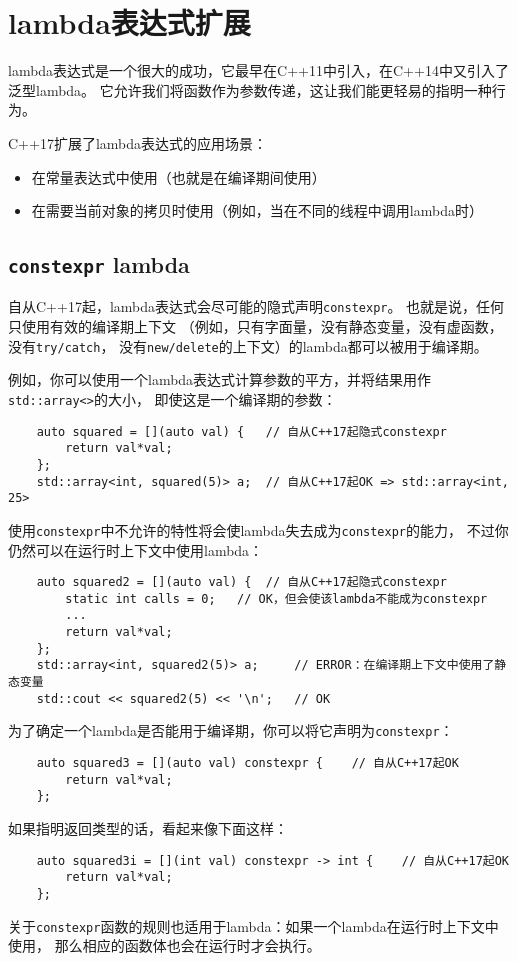 \section{lambda表达式扩展}\label{ch6}
lambda表达式是一个很大的成功，它最早在C++11中引入，在C++14中又引入了泛型lambda。
它允许我们将函数作为参数传递，这让我们能更轻易的指明一种行为。

C++17扩展了lambda表达式的应用场景：
\begin{itemize}[leftmargin=*]
    \item 在常量表达式中使用（也就是在编译期间使用）
    \item 在需要当前对象的拷贝时使用（例如，当在不同的线程中调用lambda时）
\end{itemize}

\subsection{\texttt{constexpr} lambda}
自从C++17起，lambda表达式会尽可能的隐式声明\texttt{constexpr}。
也就是说，任何只使用有效的编译期上下文
（例如，只有字面量，没有静态变量，没有虚函数，没有\texttt{try/catch}，
没有\texttt{new/delete}的上下文）的lambda都可以被用于编译期。

例如，你可以使用一个lambda表达式计算参数的平方，并将结果用作\texttt{std::array<>}的大小，
即使这是一个编译期的参数：
\begin{lstlisting}
    auto squared = [](auto val) {   // 自从C++17起隐式constexpr
        return val*val;
    };
    std::array<int, squared(5)> a;  // 自从C++17起OK => std::array<int, 25>
\end{lstlisting}
使用\texttt{constexpr}中不允许的特性将会使lambda失去成为\texttt{constexpr}的能力，
不过你仍然可以在运行时上下文中使用lambda：
\begin{lstlisting}
    auto squared2 = [](auto val) {  // 自从C++17起隐式constexpr
        static int calls = 0;   // OK，但会使该lambda不能成为constexpr
        ...
        return val*val;
    };
    std::array<int, squared2(5)> a;     // ERROR：在编译期上下文中使用了静态变量
    std::cout << squared2(5) << '\n';   // OK
\end{lstlisting}
为了确定一个lambda是否能用于编译期，你可以将它声明为\texttt{constexpr}：
\begin{lstlisting}
    auto squared3 = [](auto val) constexpr {    // 自从C++17起OK
        return val*val;
    };
\end{lstlisting}
如果指明返回类型的话，看起来像下面这样：
\begin{lstlisting}
    auto squared3i = [](int val) constexpr -> int {    // 自从C++17起OK
        return val*val;
    };
\end{lstlisting}
关于\texttt{constexpr}函数的规则也适用于lambda：如果一个lambda在运行时上下文中使用，
那么相应的函数体也会在运行时才会执行。

